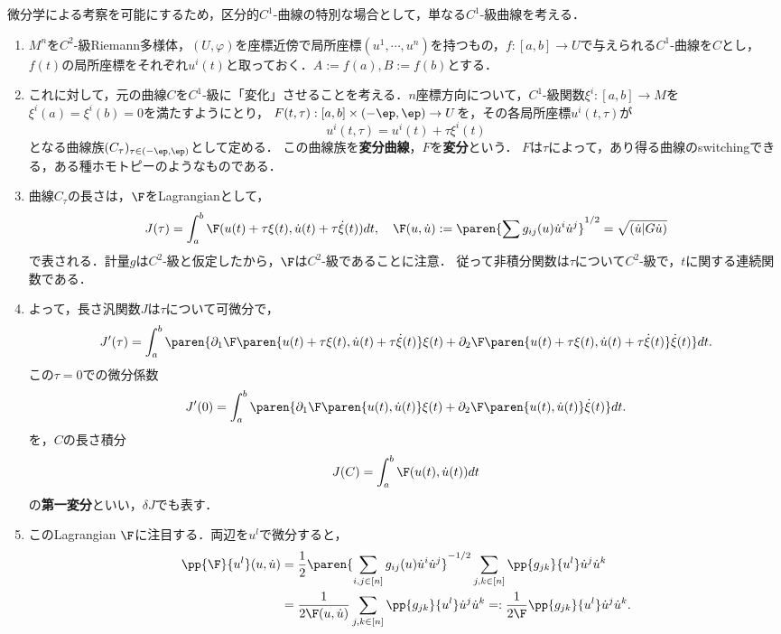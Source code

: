 \documentclass[uplatex,dvipdfmx]{jsreport}
\begin{document}
\begin{notation}\label{notation-Einstein-and-Christoffel}
    微分学による考察を可能にするため，区分的$C^1$-曲線の特別な場合として，単なる$C^1$-級曲線を考える．
    \begin{enumerate}
        \item $M^n$を$C^2$-級Riemann多様体，$(U,\varphi)$を座標近傍で局所座標$(u^1,\cdots,u^n)$を持つもの，$f:[a,b]\to U$で与えられる$C^1$-曲線を$C$とし，
        $f(t)$の局所座標をそれぞれ$u^i(t)$と取っておく．$A:=f(a),B:=f(b)$とする．
        \item これに対して，元の曲線$C$を$C^1$-級に「変化」させることを考える．$n$座標方向について，$C^1$-級関数$\xi^i:[a,b]\to M$を$\xi^i(a)=\xi^i(b)=0$を満たすようにとり，
        $F(t,\tau):[a,b]\times(-\ep,\ep)\to U$を，その各局所座標$u^i(t,\tau)$が
        \[u^i(t,\tau)=u^i(t)+\tau\xi^i(t)\]
        となる曲線族$(C_\tau)_{\tau\in(-\ep,\ep)}$として定める．
        この曲線族を\textbf{変分曲線}，$F$を\textbf{変分}という．
        $F$は$\tau$によって，あり得る曲線のswitchingできる，ある種ホモトピーのようなものである．
        \item 曲線$C_\tau$の長さは，$\F$をLagrangianとして，
        \[J(\tau)=\int^b_a\F(u(t)+\tau\xi(t),\dot{u}(t)+\tau\dot{\xi}(t))dt,\quad\F(u,\dot{u}):=\paren{\sum g_{ij}(u)\dot{u}^i\dot{u}^j}^{1/2}=\sqrt{(\dot{u}|G\dot{u})}\]
        で表される．計量$g$は$C^2$-級と仮定したから，$\F$は$C^2$-級であることに注意．
        従って非積分関数は$\tau$について$C^2$-級で，$t$に関する連続関数である．
        \item よって，長さ汎関数$J$は$\tau$について可微分で，
        \[J'(\tau)=\int^b_a\paren{\partial_1\F\paren{u(t)+\tau\xi(t),\dot{u}(t)+\tau\dot{\xi}(t)}\xi(t)+\partial_2\F\paren{u(t)+\tau\xi(t),\dot{u}(t)+\tau\dot{\xi}(t)}\dot{\xi}(t)}dt.\]
        この$\tau=0$での微分係数
        \[J'(0)=\int^b_a\paren{\partial_1\F\paren{u(t),\dot{u}(t)}\xi(t)+\partial_2\F\paren{u(t),\dot{u}(t)}\dot{\xi}(t)}dt.\]
        を，$C$の長さ積分
        \[J(C)=\int^b_a\F(u(t),\dot{u}(t))dt\]
        の\textbf{第一変分}といい，$\delta J$でも表す．
        \item このLagrangian $\F$に注目する．両辺を$u^l$で微分すると，
        \begin{align*}
            \pp{\F}{u^l}(u,\dot{u})&=\frac{1}{2}\paren{\sum_{i,j\in[n]}g_{ij}(u)\dot{u}^i\dot{u}^j}^{-1/2}\sum_{j,k\in[n]}\pp{g_{jk}}{u^l}\dot{u}^j\dot{u}^k\\
            &=\frac{1}{2\F(u,\dot{u})}\sum_{j,k\in[n]}\pp{g_{jk}}{u^l}\dot{u}^j\dot{u}^k=:\frac{1}{2\F}\pp{g_{jk}}{u^l}\dot{u}^j\dot{u}^k.

\end{align*}
\end{enumerate}
\end{notation}
\end{document}
